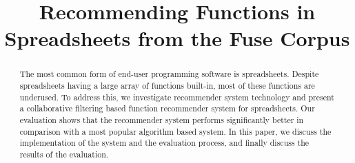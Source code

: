 \documentclass[conference]{IEEEtran}
\begin{document}
%
\title{Recommending Functions in Spreadsheets from the Fuse Corpus}


\author{
}


% 



\maketitle


\begin{abstract}
The most common form of end-user programming software is spreadsheets. Despite spreadsheets having a large array of functions built-in, most of these functions are underused. To address this, we investigate recommender system technology and present a collaborative filtering based function recommender system for spreadsheets. Our evaluation shows that the recommender system performs significantly better in comparison with a most popular algorithm based system. In this paper, we discuss the implementation of the system and the evaluation process, and finally discuss the results of the evaluation.
\end{abstract}
\end{document}
